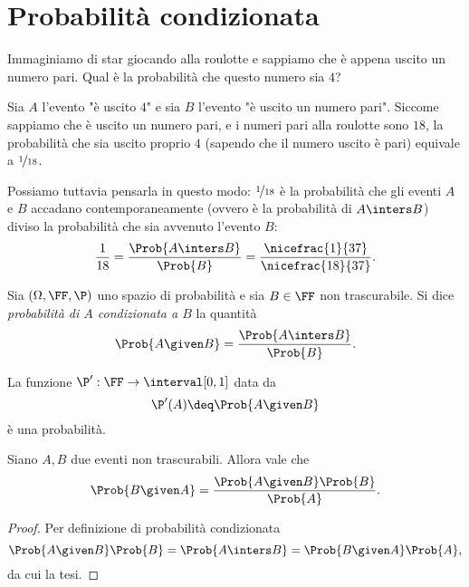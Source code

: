\section{Probabilità condizionata}

\begin{example}
    Immaginiamo di star giocando alla roulotte e sappiamo che è appena uscito un numero pari. Qual è la probabilità che questo numero sia $4$?
    
    Sia $A$ l'evento "è uscito $4$" e sia $B$ l'evento "è uscito un numero pari". Siccome sappiamo che è uscito un numero pari, e i numeri pari alla roulotte sono $18$, la probabilità che sia uscito proprio $4$ (sapendo che il numero uscito è pari) equivale a $\nicefrac{1}{18}$.

    Possiamo tuttavia pensarla in questo modo: $\nicefrac{1}{18}$ è la probabilità che gli eventi $A$ e $B$ accadano contemporaneamente (ovvero è la probabilità di $A \inters B$) diviso la probabilità che sia avvenuto l'evento $B$: \[
        \frac{1}{18} = \frac{\Prob{A \inters B}}{\Prob{B}} = \frac{\nicefrac{1}{37}}{\nicefrac{18}{37}}.    
    \]
\end{example}

\begin{definition}
     Sia $(\Omega, \FF, \P)$ uno spazio di probabilità e sia $B \in \FF$ non trascurabile. Si dice \emph{probabilità di $A$ condizionata a $B$} la quantità \[
        \Prob{A \given B} =  \frac{\Prob{A \inters B}}{\Prob{B}}.   
    \]
\end{definition}

\begin{remark}
    La funzione $\P^\prime : \FF \to \interval[{0, 1}]$ data da \[
        \P^\prime(A) \deq \Prob{A \given B}    
    \] è una probabilità.
\end{remark}

\begin{proposition}
     Siano $A, B$ due eventi non trascurabili. Allora vale che \[
        \Prob{B \given A} = \frac{\Prob{A \given B}\Prob{B}}{\Prob{A}}.    
    \]
\end{proposition}
\begin{proof}
    Per definizione di probabilità condizionata \[
        \Prob{A \given B}\Prob{B} = \Prob{A \inters B} = \Prob{B \given A}\Prob{A},    
    \] da cui la tesi.
\end{proof}

